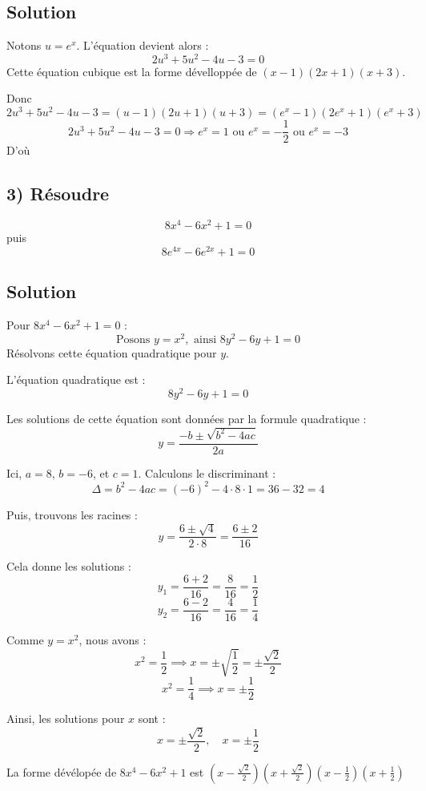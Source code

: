 \documentclass[12pt]{article}
\begin{document}
\subsection*{Solution}
Notons \( u = e^x \). L'équation devient alors :
\[
2u^3 + 5u^2 - 4u - 3 = 0
\]
Cette équation cubique est la forme dévelloppée de $(x-1)(2x+1)(x+3)$.

Donc $2u^3 + 5u^2 - 4u - 3=(u-1)(2u+1)(u+3)=(e^x-1)(2e^x+1)(e^x+3)$
\[
2u^3 + 5u^2 - 4u - 3 = 0 \Longrightarrow e^x=1 \text{ ou } e^x=-\frac{1}{2} \text{ ou } e^x=-3
\]
D'où \textcolor{green}{}
\subsection*{3) Résoudre} 
\[
8x^4 - 6x^2 + 1 = 0
\]
puis 
\[
8e^{4x} - 6e^{2x} + 1 = 0
\]

\subsection*{Solution}
Pour \(8x^4 - 6x^2 + 1 = 0\) :
\[
\text{Posons } y = x^2, \text{ ainsi } 8y^2 - 6y + 1 = 0
\]
Résolvons cette équation quadratique pour \(y\).

L'équation quadratique est :
\[
8y^2 - 6y + 1 = 0
\]

Les solutions de cette équation sont données par la formule quadratique :
\[
y = \frac{-b \pm \sqrt{b^2 - 4ac}}{2a}
\]

Ici, \(a = 8\), \(b = -6\), et \(c = 1\). Calculons le discriminant :
\[
\Delta = b^2 - 4ac = (-6)^2 - 4 \cdot 8 \cdot 1 = 36 - 32 = 4
\]

Puis, trouvons les racines :
\[
y = \frac{6 \pm \sqrt{4}}{2 \cdot 8} = \frac{6 \pm 2}{16}
\]

Cela donne les solutions :
\[
y_1 = \frac{6 + 2}{16} = \frac{8}{16} = \frac{1}{2}
\]
\[
y_2 = \frac{6 - 2}{16} = \frac{4}{16} = \frac{1}{4}
\]

Comme \(y = x^2\), nous avons :
\[
x^2 = \frac{1}{2} \implies x = \pm \sqrt{\frac{1}{2}} = \pm \frac{\sqrt{2}}{2}
\]
\[
x^2 = \frac{1}{4} \implies x = \pm \frac{1}{2}
\]

Ainsi, les solutions pour \(x\) sont :
\[
x = \pm \frac{\sqrt{2}}{2}, \quad x = \pm \frac{1}{2}
\]

\textcolor{green}{}

La forme dévélopée de \(8x^4 - 6x^2 + 1\) est \((x-\frac{\sqrt{2}}{2})(x+\frac{\sqrt{2}}{2})(x-\frac{1}{2})(x+\frac{1}{2})\)
\end{document}
